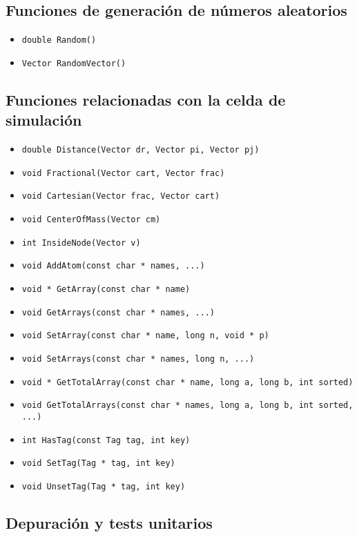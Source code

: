 \documentclass[a4paper,12pt]{article}
\begin{document}
\subsection{Funciones de generaci\'on de n\'umeros aleatorios}

\begin{itemize}
\item \verb'double Random()'
\item \verb'Vector RandomVector()'
\end{itemize}

\subsection{Funciones relacionadas con la celda de simulaci\'on}

\begin{itemize}
\item \verb'double Distance(Vector dr, Vector pi, Vector pj)'
\item \verb'void Fractional(Vector cart, Vector frac)'
\item \verb'void Cartesian(Vector frac, Vector cart)'
\item \verb'void CenterOfMass(Vector cm)'
\item \verb'int InsideNode(Vector v)'
\item \verb'void AddAtom(const char * names, ...)'
\item \verb'void * GetArray(const char * name)'
\item \verb'void GetArrays(const char * names, ...)'
\item \verb'void SetArray(const char * name, long n, void * p)'
\item \verb'void SetArrays(const char * names, long n, ...)'
\item \verb'void * GetTotalArray(const char * name, long a, long b, int sorted)'
\item \verb'void GetTotalArrays(const char * names, long a, long b, int sorted, ...)'
\item \verb'int HasTag(const Tag tag, int key)'
\item \verb'void SetTag(Tag * tag, int key)'
\item \verb'void UnsetTag(Tag * tag, int key)'
\end{itemize}

\subsection{Depuraci\'on y tests unitarios}
\end{document}
